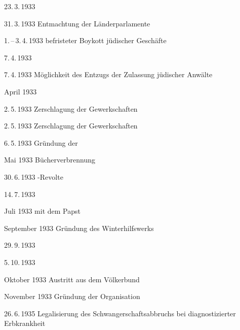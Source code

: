 \begin{chronik}
\item[23.\,3.\,1933]

\item[31.\,3.\,1933]
Entmachtung der Länderparlamente

\item[1.\,--\,3.\,4.\,1933]
befristeter Boykott jüdischer Geschäfte

\item[7.\,4.\,1933]

\item[7.\,4.\,1933]
Möglichkeit des Entzugs der Zulassung jüdischer Anwälte

\item[April 1933]

\item[2.\,5.\,1933]
Zerschlagung der Gewerkschaften

\item[2.\,5.\,1933]
Zerschlagung der Gewerkschaften

\item[6.\,5.\,1933]
Gründung der 

\item[Mai 1933]
Bücherverbrennung

\item[30.\,6.\,1933]
-Revolte

\item[14.\,7.\,1933]

\item[Juli 1933]
 mit dem Papst

\item[September 1933]
Gründung des Winterhilfswerks

\item[29.\,9.\,1933]

\item[5.\,10.\,1933]

\item[Oktober 1933]
Austritt aus dem Völkerbund

\item[November 1933]
Gründung der Organisation 

\item[26.\,6.\,1935]
Legalisierung des Schwangerschaftsabbruchs bei diagnostizierter
Erbkrankheit


\end{chronik}
